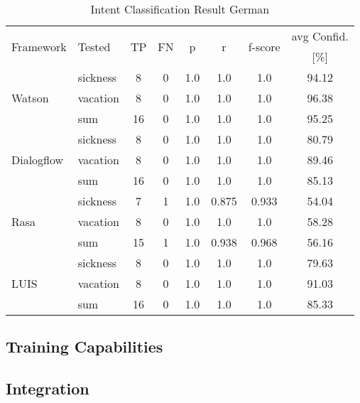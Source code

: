 \begin{table}[h]
    \centering
    \begin{tabular}{ l | l | c | c | c | c | c | c  }
        \multirow{2}{*}{Framework} & \multirow{2}{*}{Tested} & \multirow{2}{*}{TP} & \multirow{2}{*}{FN} & \multirow{2}{*}{p} & \multirow{2}{*}{r} & \multirow{2}{*}{f-score} & avg Confid. \\ 
                 &&          &            &   & & & [\%]     \\ \hline \hline
        \multirow{3}{*}{Watson} 
        & sickness & 8 & 0& 1.0& 1.0& 1.0&94.12 \\
        & vacation & 8 & 0& 1.0& 1.0& 1.0&96.38 \\
        & sum      &16 & 0& 1.0& 1.0& 1.0&95.25 \\ \hline
        
        \multirow{3}{*}{Dialogflow} 
        & sickness & 8& 0& 1.0& 1.0& 1.0&80.79\\
        & vacation & 8& 0& 1.0& 1.0& 1.0&89.46\\
        & sum      &16& 0& 1.0& 1.0& 1.0&85.13\\ \hline

        \multirow{3}{*}{Rasa} 
        & sickness & 7& 1& 1.0& 0.875  & 0.933& 54.04\\
        & vacation & 8& 0& 1.0& 1.0& 1.0& 58.28\\
        & sum      &15& 1& 1.0& 0.938& 0.968& 56.16\\ \hline

        \multirow{3}{*}{LUIS} 
        & sickness & 8& 0& 1.0& 1.0 & 1.0& 79.63\\
        & vacation & 8& 0& 1.0& 1.0 & 1.0& 91.03\\
        & sum      & 16&0& 1.0& 1.0 & 1.0& 85.33\\
    \end{tabular}
    \caption{Intent Classification Result German} \label{tab:intent_classification_result_de}
\end{table} \noindent

\subsection*{Training Capabilities}
\subsection*{Integration}
